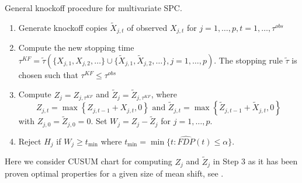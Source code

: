 \documentclass[a4paper,12pt]{article}
\providecommand{\tightlist}{%
  \setlength{\itemsep}{0pt}\setlength{\parskip}{0pt}}
\begin{document}
General knockoff procedure for multivariate SPC.
\begin{enumerate}
\tightlist
\item Generate knockoff copies $\tilde X_{j,t}$ of observed $X_{j,t}$ for $j=1, \ldots, p, t = 1, \ldots, \tau^{obs}$
\item Compute the new stopping time $\tau^{KF}=\tilde \tau (\{ X_{j,1}, X_{j,2}, \ldots\} \cup \{ \tilde X_{j,1},\tilde X_{j,2},\ldots\}, j=1, \ldots, p)$. The stopping rule $\tilde \tau$ is chosen such that $\tau^{KF} \le \tau^{obs}$
\item Compute $Z_j = Z_{j,\tau^{KF}}$ and $\tilde Z_j =\tilde Z_{j,\tau^{KF}}$, where
$$
Z_{j,t} = \max \left \{Z_{j,t-1} + X_{j,t}, 0 \right \} \text{  and  } \tilde Z_{j,t} = \max \left \{\tilde Z_{j,t-1} + \tilde X_{j,t}, 0 \right \}
$$
with $Z_{j,0} = \tilde Z_{j,0} = 0$. Set $W_j=Z_j - \tilde Z_j$ for $j=1, \ldots, p$.
\item Reject $H_j$ if $W_j \ge t_{\min}$ where $t_{\min} = \min \{t : \widehat{FDP}(t) \le \alpha\}$.
 \end{enumerate}

Here we consider CUSUM chart for computing $Z_j$ and $\tilde Z_j$ in Step 3 as it has been proven optimal properties for a given size of mean shift, see \cite{bagshaw1975influence}.
\end{document}
